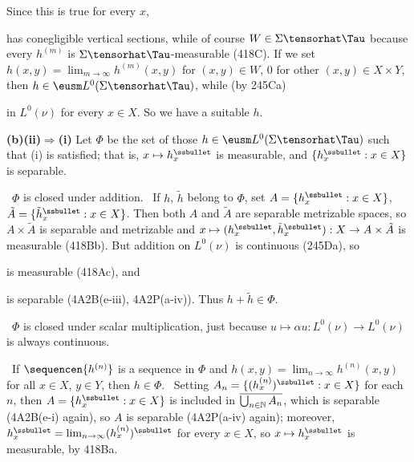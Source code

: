 {Since this is true for every $x$,


\noindent has conegligible vertical sections, while of course
$W\in\Sigma\tensorhat\Tau$ because every $h^{(m)}$ is
$\Sigma\tensorhat\Tau$-measurable (418C).   If we set
$h(x,y)=\lim_{m\to\infty}h^{(m)}(x,y)$ for $(x,y)\in W$, $0$ for other
$(x,y)\in X\times Y$, then $h\in\eusm L^0(\Sigma\tensorhat\Tau)$, while
(by 245Ca)


\noindent in $L^0(\nu)$ for every $x\in X$.   So we have a suitable $h$.


\medskip

{\bf (b)(ii)$\Rightarrow$(i)} Let $\Phi$ be the set of those
$h\in\eusm L^0(\Sigma\tensorhat\Tau)$ such that (i) is satisfied;  that is,
$x\mapsto h_x^{\ssbullet}$ is measurable, and
$\{h_x^{\ssbullet}:x\in X\}$ is separable.

\medskip

\quad\grheada\ $\Phi$ is closed under addition.   \Prf\ If $h$,
$\tilde h$ belong to $\Phi$, set $A=\{h_x^{\ssbullet}:x\in X\}$,
$\tilde A=\{\tilde h_x^{\ssbullet}:x\in X\}$.   Then both $A$ and
$\tilde A$ are
separable metrizable spaces, so $A\times\tilde A$ is separable and
metrizable and
$x\mapsto(h_x^{\ssbullet},\tilde h_x^{\ssbullet}):X\to A\times\tilde A$
is measurable (418Bb).   But addition on $L^0(\nu)$ is
continuous (245Da), so


\noindent is measurable (418Ac), and


\noindent is separable (4A2B(e-iii), 4A2P(a-iv)).
Thus $h+\tilde h\in\Phi$.\ \Qed

\medskip

\quad\grheadb\ $\Phi$ is closed under scalar multiplication, just
because $u\mapsto\alpha u:L^0(\nu)\to L^0(\nu)$ is always continuous.

\medskip

\quad\grheadc\ If $\sequencen{h^{(n)}}$ is a sequence in $\Phi$ and
$h(x,y)=\lim_{n\to\infty}h^{(n)}(x,y)$ for all $x\in X$, $y\in Y$, then
$h\in\Phi$.   \Prf\ Setting $A_n=\{(h^{(n)}_x)^{\ssbullet}:x\in X\}$ for
each $n$, then $A=\{h_x^{\ssbullet}:x\in X\}$ is included in
$\overline{\bigcup_{n\in\Bbb N}A_n}$, which is separable (4A2B(e-i)
again), so $A$ is separable (4A2P(a-iv) again);  moreover,
$h_x^{\ssbullet}=\lim_{n\to\infty}(h^{(n)}_x)^{\ssbullet}$ for every
$x\in X$, so $x\mapsto h_x^{\ssbullet}$ is measurable, by
418Ba.\ \Qed

}
